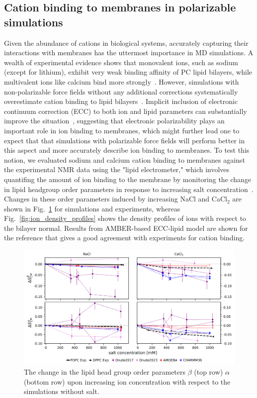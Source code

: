 \documentclass[journal=jacsat,manuscript=article,layout=singlecolumn]{achemso}
\begin{document}
\subsection{Cation binding to membranes in polarizable simulations}

Given the abundance of cations in biological systems, accurately capturing their interactions with membranes has the uttermost importance in MD simulations. A wealth of  experimental evidence shows that monovalent ions, such as sodium (except for lithium), exhibit very weak binding affinity of PC lipid bilayers, while multivalent ions like calcium bind more strongly~\cite{Catte2016}. However, simulations with non-polarizable force fields without any additional corrections systematically overestimate cation binding to lipid bilayers~\cite{Catte2016}. Implicit inclusion of electronic continuum correction (ECC) to both ion and lipid parameters can substantially improve the situation~\cite{Melcr:2018a,melcr2019improved,bacle21}, suggesting that electronic polarizability plays an important role in ion binding to membranes, which might further lead one to expect that that simulations with polarizable force fields will perform better in this aspect and more accurately describe ion binding to membranes.
To test this notion, we evaluated sodium and calcium cation binding to membranes against the experimental NMR data using the "lipid electrometer," which involves quantifing the amount of ion binding to the membrane by monitoring the change in lipid headgroup order parameters in response to increasing salt concentration~\cite{Catte2016}. Changes in these order parameters induced by increasing NaCl and CaCl$_2$ are shown in Fig.~\ref{fig:popc_order_parameter_change} for simulations and experiments, whereas Fig.~\ref{fig:ion_density_profiles} shows the density profiles of ions with respect to the bilayer normal. Results from AMBER-based ECC-lipid model are shown for the reference that gives a good agreement with experiments for cation binding. 

\begin{figure}[!hbt]
	\centering
	\includegraphics{Figures/order_parameter_change.png}
	\caption{The change in the lipid head group order parameters $\beta$ (top row) $\alpha$ (bottom row) upon increasing ion concentration with respect to the simulations without salt. }
	\label{fig:popc_order_parameter_change}
\end{figure}
\end{document}
